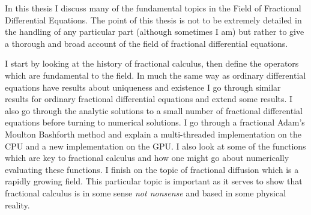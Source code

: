 In this thesis I discuss many of the fundamental topics in the Field of Fractional Differential Equations. The point of this thesis is not to be extremely detailed in the handling of any particular part (although sometimes I am) but rather to give a thorough and broad account of the field of fractional differential equations. 

I start by looking at the history of fractional calculus, then define the operators which are fundamental to the field. In much the same way as ordinary differential equations have results about uniqueness and existence I go through similar results for ordinary fractional differential equations and extend some results. I also go through the analytic solutions to a small number of fractional differential equations before turning to numerical solutions. I go through a fractional Adam's Moulton Bashforth method and explain a multi-threaded implementation on the CPU and a new implementation on the GPU. I also look at some of the functions which are key to fractional calculus and how one might go about numerically evaluating these functions. I finish on the topic of fractional diffusion which is a rapidly growing field. This particular topic is important as it serves to show that fractional calculus is in some sense \emph{not nonsense} and based in some physical reality.
